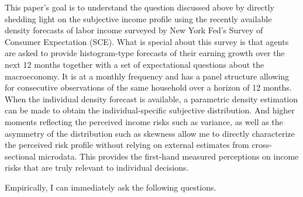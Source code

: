 \documentclass[12pt,notitlepage,onecolumn,aps,pra]{article}
\begin{document}
This paper's goal is to understand the question discussed above by
directly shedding light on the subjective income profile using the
recently available density forecasts of labor income surveyed by New
York Fed's Survey of Consumer Expectation (SCE). What is special about
this survey is that agents are asked to provide histogram-type forecasts
of their earning growth over the next 12 months together with a set of
expectational questions about the macroeconomy. It is at a monthly
frequency and has a panel structure allowing for consecutive
observations of the same household over a horizon of 12 months. When the
individual density forecast is available, a parametric density
estimation can be made to obtain the individual-specific subjective
distribution. And higher moments reflecting the perceived income risks
such as variance, as well as the asymmetry of the distribution such as
skewness allow me to directly characterize the perceived risk profile
without relying on external estimates from cross-sectional microdata.
This provides the first-hand measured perceptions on income risks that
are truly relevant to individual decisions.

Empirically, I can immediately ask the following questions.
\end{document}
